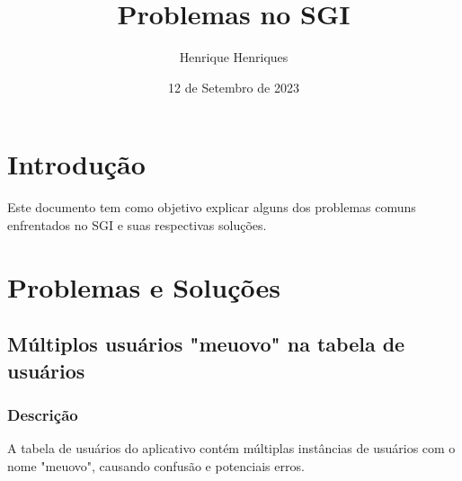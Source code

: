 \documentclass[12pt]{article}
\title{Problemas no SGI}
\author{Henrique Henriques}
\date{12 de Setembro de 2023}
\begin{document}
\maketitle

\section{Introdução}
Este documento tem como objetivo explicar alguns dos problemas comuns enfrentados no SGI e suas respectivas soluções.

\section{Problemas e Soluções}
\subsection{Múltiplos usuários "meuovo" na tabela de usuários}
\subsubsection{Descrição}
A tabela de usuários do aplicativo contém múltiplas instâncias de usuários com o nome "meuovo", causando confusão e potenciais erros.
\end{document}
